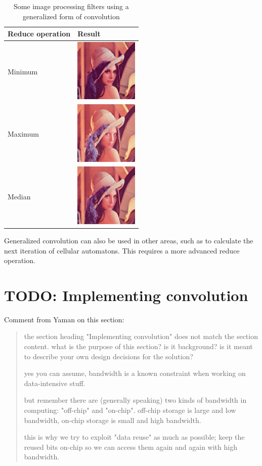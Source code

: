 \begin{table}
    \centering
    \begin{tabular}{lm{3cm}}
        Reduce operation & Result \\
        \hline
        Minimum & \includegraphics[width=3cm]{img/LenaMin} \\
        Maximum & \includegraphics[width=3cm]{img/LenaMax} \\
        Median & \includegraphics[width=3cm]{img/LenaMedian}
    \end{tabular}

    \caption{Some image processing filters using a generalized form of convolution}
    \label{tab:GeneralizedKernelMatrices}
\end{table}

Generalized convolution can also be used in other areas, such as to calculate the next iteration of cellular automatons. This requires a more advanced reduce operation.

\section{TODO: Implementing convolution}
Comment from Yaman on this section:
\begin{quotation}
the section heading "Implementing convolution" does not match the section content. what is the purpose of this section? is it background? is it meant to describe your own design decisions for the solution?

yes you can assume, bandwidth is a known constraint when working on data-intensive stuff.

but remember there are (generally speaking) two kinds of bandwidth in computing: "off-chip" and "on-chip". off-chip storage is large and low bandwidth, on-chip storage is small and high bandwidth. 

this is why we try to exploit "data reuse" as much as possible; keep the reused bits on-chip so we can access them again and again with high bandwidth.
\end{quotation}


